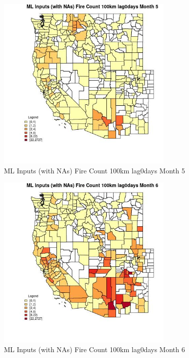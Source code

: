 \begin{figure} 
\centering  
\includegraphics[width=0.77\textwidth]{Code_Outputs/Report_ML_input_PM25_Step4_part_f_de_duplicated_aves_prioritize_24hr_obswNAs_CountyFire_Count_100km_lag0daysmedianMonth5.jpg} 
\caption{\label{fig:Report_ML_input_PM25_Step4_part_f_de_duplicated_aves_prioritize_24hr_obswNAsCountyFire_Count_100km_lag0daysmedianMonth5}ML Inputs (with NAs) Fire Count 100km lag0days Month 5} 
\end{figure} 
 

\begin{figure} 
\centering  
\includegraphics[width=0.77\textwidth]{Code_Outputs/Report_ML_input_PM25_Step4_part_f_de_duplicated_aves_prioritize_24hr_obswNAs_CountyFire_Count_100km_lag0daysmedianMonth6.jpg} 
\caption{\label{fig:Report_ML_input_PM25_Step4_part_f_de_duplicated_aves_prioritize_24hr_obswNAsCountyFire_Count_100km_lag0daysmedianMonth6}ML Inputs (with NAs) Fire Count 100km lag0days Month 6} 
\end{figure} 
 

